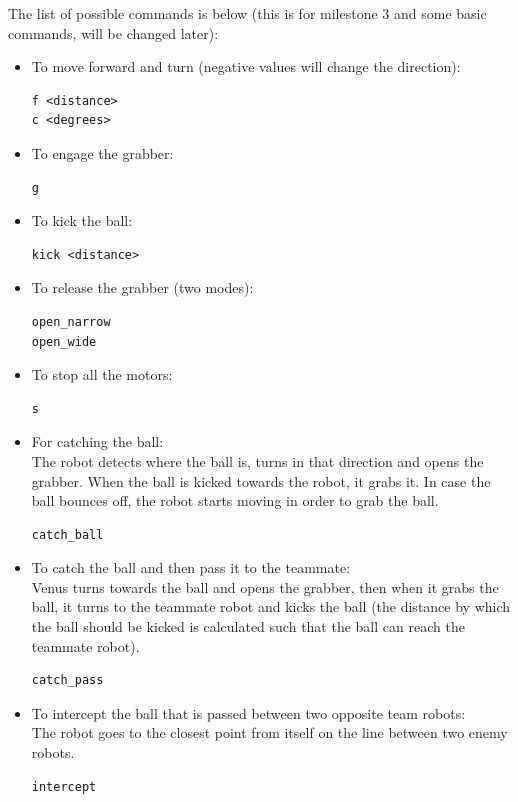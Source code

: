 \documentclass[12pt]{article}
\begin{document}
The list of possible commands is below (this is for milestone 3 and some basic commands, will be changed later):
\bigskip
\begin{itemize}

\item To move forward and turn (negative values will change the direction):
\begin{lstlisting}
f <distance>
c <degrees>
\end{lstlisting}

\item To engage the grabber:
\begin{lstlisting}
g
\end{lstlisting}

\item To kick the ball:
\begin{lstlisting}
kick <distance>
\end{lstlisting}

\item To release the grabber (two modes):
\begin{lstlisting}
open_narrow
open_wide
\end{lstlisting}

\item To stop all the motors:
\begin{lstlisting}
s
\end{lstlisting}

\item For catching the ball:
\\The robot detects where the ball is, turns in that direction and opens the grabber. When the ball is kicked towards the robot, it grabs it. In case the ball bounces off, the robot starts moving in order to grab the ball.
\bigskip

\begin{lstlisting}
catch_ball
\end{lstlisting}
\newpage

\item To catch the ball and then pass it to the teammate:
\\Venus turns towards the ball and opens the grabber, then when it grabs the ball, it turns to the teammate robot and kicks the ball (the distance by which the ball should be kicked is calculated such that the ball can reach the teammate robot).
\begin{lstlisting}
catch_pass
\end{lstlisting}

\item To intercept the ball that is passed between two opposite team robots:
\\The robot goes to the closest point from itself on the line between two enemy robots.
\begin{lstlisting}
intercept
\end{lstlisting}


\end{itemize}
\end{document}
